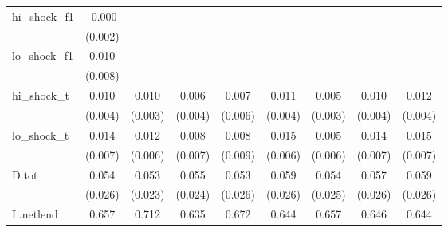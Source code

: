 {\begin{tabular}{l*{8}{c}}
\addlinespace
hi\_shock\_f1 &      -0.000         &                     &                     &                     &                     &                     &                     &                     \\
            &     (0.002)         &                     &                     &                     &                     &                     &                     &                     \\
\addlinespace
lo\_shock\_f1 &       0.010         &                     &                     &                     &                     &                     &                     &                     \\
            &     (0.008)         &                     &                     &                     &                     &                     &                     &                     \\
\addlinespace
hi\_shock\_t  &       0.010\sym{**} &       0.010\sym{***}&       0.006         &       0.007         &       0.011\sym{***}&       0.005\sym{*}  &       0.010\sym{**} &       0.012\sym{**} \\
            &     (0.004)         &     (0.003)         &     (0.004)         &     (0.006)         &     (0.004)         &     (0.003)         &     (0.004)         &     (0.004)         \\
\addlinespace
lo\_shock\_t  &       0.014\sym{*}  &       0.012\sym{*}  &       0.008         &       0.008         &       0.015\sym{**} &       0.005         &       0.014\sym{**} &       0.015\sym{**} \\
            &     (0.007)         &     (0.006)         &     (0.007)         &     (0.009)         &     (0.006)         &     (0.006)         &     (0.007)         &     (0.007)         \\
\addlinespace
D.tot       &       0.054\sym{**} &       0.053\sym{**} &       0.055\sym{**} &       0.053\sym{*}  &       0.059\sym{**} &       0.054\sym{**} &       0.057\sym{**} &       0.059\sym{**} \\
            &     (0.026)         &     (0.023)         &     (0.024)         &     (0.026)         &     (0.026)         &     (0.025)         &     (0.026)         &     (0.026)         \\
\addlinespace
L.netlend   &       0.657\sym{***}&       0.712\sym{***}&       0.635\sym{***}&       0.672\sym{***}&       0.644\sym{***}&       0.657\sym{***}&       0.646\sym{***}&       0.644\sym{***}\\

\end{tabular}}
